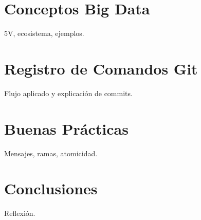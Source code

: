 
\graphicspath{{./}}
\GenerarPortada
\section{Conceptos Big Data} 5V, ecosistema, ejemplos.
\section{Registro de Comandos Git} Flujo aplicado y explicación de commits.
\section{Buenas Prácticas} Mensajes, ramas, atomicidad.
\section{Conclusiones} Reflexión.

